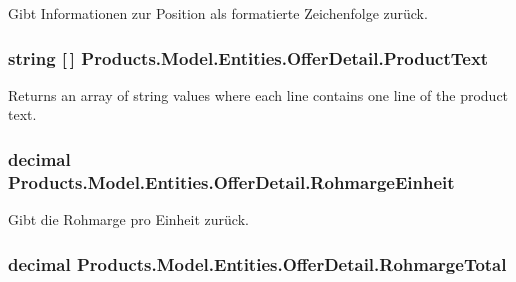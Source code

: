 Gibt Informationen zur Position als formatierte Zeichenfolge zurück. 

\subsubsection[{\texorpdfstring{Product\+Text}{ProductText}}]{\setlength{\rightskip}{0pt plus 5cm}string \mbox{[}$\,$\mbox{]} Products.\+Model.\+Entities.\+Offer\+Detail.\+Product\+Text\hspace{0.3cm}{\ttfamily [get]}}\hypertarget{class_products_1_1_model_1_1_entities_1_1_offer_detail_a05c96b803a218afd70c1b7e8b1203c74}{}\label{class_products_1_1_model_1_1_entities_1_1_offer_detail_a05c96b803a218afd70c1b7e8b1203c74}


Returns an array of string values where each line contains one line of the product text. 

\subsubsection[{\texorpdfstring{Rohmarge\+Einheit}{RohmargeEinheit}}]{\setlength{\rightskip}{0pt plus 5cm}decimal Products.\+Model.\+Entities.\+Offer\+Detail.\+Rohmarge\+Einheit\hspace{0.3cm}{\ttfamily [get]}}\hypertarget{class_products_1_1_model_1_1_entities_1_1_offer_detail_ac6b0dd95da209071cb1b638c99f85006}{}\label{class_products_1_1_model_1_1_entities_1_1_offer_detail_ac6b0dd95da209071cb1b638c99f85006}


Gibt die Rohmarge pro Einheit zurück. 

\subsubsection[{\texorpdfstring{Rohmarge\+Total}{RohmargeTotal}}]{\setlength{\rightskip}{0pt plus 5cm}decimal Products.\+Model.\+Entities.\+Offer\+Detail.\+Rohmarge\+Total\hspace{0.3cm}{\ttfamily [get]}}\hypertarget{class_products_1_1_model_1_1_entities_1_1_offer_detail_a01a5f4609d7ea56e4d7eca8da01a7980}{}\label{class_products_1_1_model_1_1_entities_1_1_offer_detail_a01a5f4609d7ea56e4d7eca8da01a7980}


